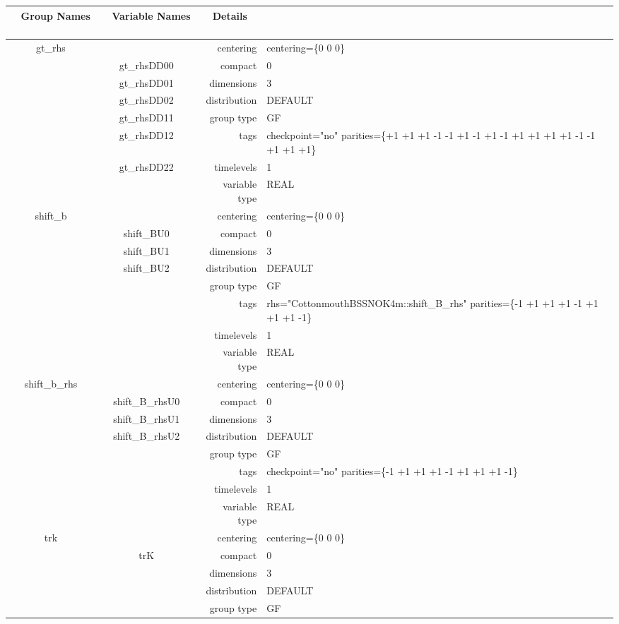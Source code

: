 \begin{tabular*}{150mm}{|c|c@{\extracolsep{\fill}}|rl|} \hline 
~ {\bf Group Names} ~ & ~ {\bf Variable Names} ~  &{\bf Details} ~ & ~ \\ 
\hline 
gt\_rhs &  & centering & centering=\{0 0 0\} \\ 
 & gt\_rhsDD00 & compact & 0 \\ 
 & gt\_rhsDD01 & dimensions & 3 \\ 
 & gt\_rhsDD02 & distribution & DEFAULT \\ 
 & gt\_rhsDD11 & group type & GF \\ 
 & gt\_rhsDD12 & tags & checkpoint="no" parities=\{+1 +1 +1  -1 -1 +1  -1 +1 -1  +1 +1 +1  +1 -1 -1  +1 +1 +1\} \\ 
 & gt\_rhsDD22 & timelevels & 1 \\ 
 &  & variable type & REAL \\ 
\hline 
shift\_b &  & centering & centering=\{0 0 0\} \\ 
 & shift\_BU0 & compact & 0 \\ 
 & shift\_BU1 & dimensions & 3 \\ 
 & shift\_BU2 & distribution & DEFAULT \\ 
 &  & group type & GF \\ 
 &  & tags & rhs="CottonmouthBSSNOK4m::shift\_B\_rhs" parities=\{-1 +1 +1  +1 -1 +1  +1 +1 -1\} \\ 
 &  & timelevels & 1 \\ 
 &  & variable type & REAL \\ 
\hline 
shift\_b\_rhs &  & centering & centering=\{0 0 0\} \\ 
 & shift\_B\_rhsU0 & compact & 0 \\ 
 & shift\_B\_rhsU1 & dimensions & 3 \\ 
 & shift\_B\_rhsU2 & distribution & DEFAULT \\ 
 &  & group type & GF \\ 
 &  & tags & checkpoint="no" parities=\{-1 +1 +1  +1 -1 +1  +1 +1 -1\} \\ 
 &  & timelevels & 1 \\ 
 &  & variable type & REAL \\ 
\hline 
trk &  & centering & centering=\{0 0 0\} \\ 
 & trK & compact & 0 \\ 
 &  & dimensions & 3 \\ 
 &  & distribution & DEFAULT \\ 
 &  & group type & GF \\ 

\end{tabular*}
